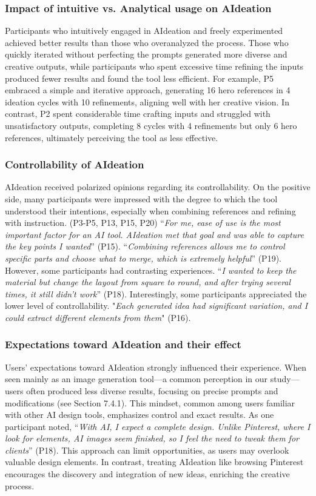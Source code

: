 \subsubsection{Impact of intuitive vs. Analytical usage on AIdeation}
Participants who intuitively engaged in AIdeation and freely experimented achieved better results than those who overanalyzed the process. Those who quickly iterated without perfecting the prompts generated more diverse and creative outputs, while participants who spent excessive time refining the inputs produced fewer results and found the tool less efficient.
For example, P5 embraced a simple and iterative approach, generating 16 hero references in 4 ideation cycles with 10 refinements, aligning well with her creative vision. In contrast, P2 spent considerable time crafting inputs and struggled with unsatisfactory outputs, completing 8 cycles with 4 refinements but only 6 hero references, ultimately perceiving the tool as less effective.


\subsubsection{Controllability of AIdeation}
AIdeation received polarized opinions regarding its controllability. On the positive side, many participants were impressed with the degree to which the tool understood their intentions, especially when combining references and refining with instruction. (P3-P5, P13, P15, P20) “\textit{For me, ease of use is the most important factor for an AI tool. AIdeation met that goal and was able to capture the key points I wanted}” (P15). “\textit{Combining references allows me to control specific parts and choose what to merge, which is extremely helpful}” (P19). However, some participants had contrasting experiences. “\textit{I wanted to keep the material but change the layout from square to round, and after trying several times, it still didn’t work}” (P18). Interestingly, some participants appreciated the lower level of controllability. "\textit{Each generated idea had significant variation, and I could extract different elements from them}" (P16).

\subsubsection{Expectations toward AIdeation and their effect}
Users' expectations toward AIdeation strongly influenced their experience. When seen mainly as an image generation tool—a common perception in our study—users often produced less diverse results, focusing on precise prompts and modifications (see Section 7.4.1). This mindset, common among users familiar with other AI design tools, emphasizes control and exact results. As one participant noted, “\textit{With AI, I expect a complete design. Unlike Pinterest, where I look for elements, AI images seem finished, so I feel the need to tweak them for clients}” (P18). This approach can limit opportunities, as users may overlook valuable design elements. In contrast, treating AIdeation like browsing Pinterest encourages the discovery and integration of new ideas, enriching the creative process.